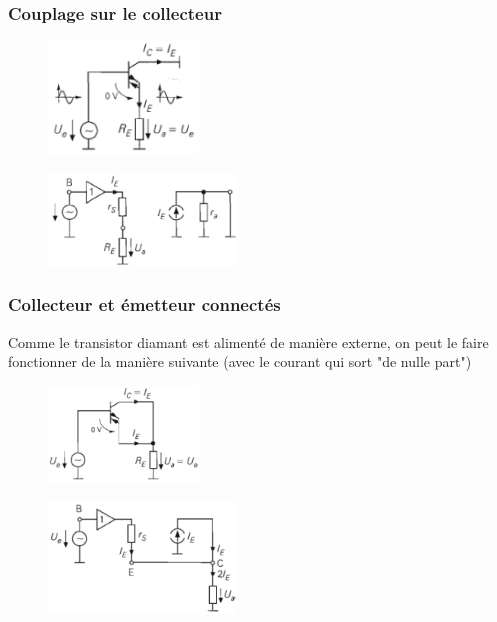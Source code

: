 \documentclass[resume]{subfiles}
\begin{document}
\begin{multicols}{3}
\subsubsection{Couplage sur le collecteur}
\begin{figure}[H]
\centering
\includegraphics[width=4.00cm]{img_64.png}
\end{figure}
\begin{figure}[H]
\centering
\includegraphics[width=5.00cm]{img_65.png}
\end{figure}
\subsubsection{Collecteur et émetteur connectés}
Comme le transistor diamant est alimenté de manière externe, on peut le faire fonctionner de la manière suivante (avec le courant qui sort "de nulle part")
\begin{figure}[H]
\centering
\includegraphics[width=4.00cm]{img_66.png}
\end{figure}
\begin{figure}[H]
\centering
\includegraphics[width=5.00cm]{img_67.png}
\end{figure}

\end{multicols}
\end{document}
